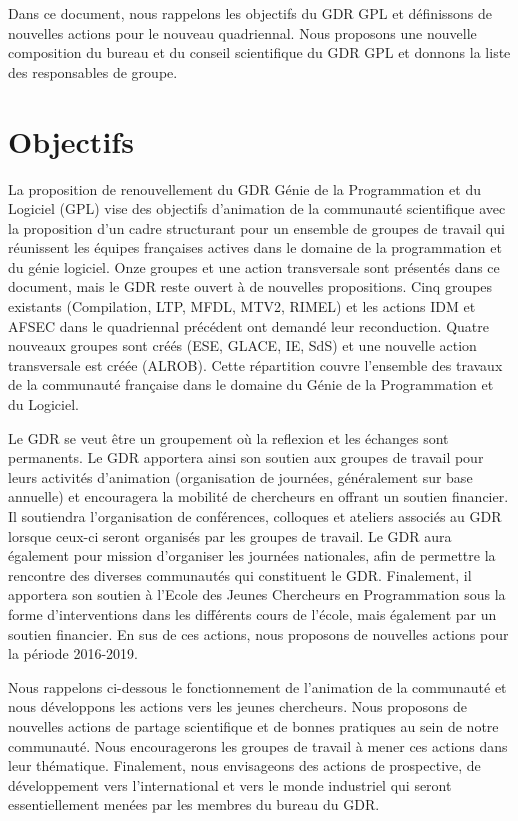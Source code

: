 \documentclass[11pt]{article}
\newcommand{\mynote}[3][black]{\textcolor{#1}{\fbox{\bfseries\sffamily\scriptsize{#2}}
{\small$\blacktriangleright$\textsf{\emph{#3}}$\blacktriangleleft$}}}
\newcommand{\pem}[1]{} %
\begin{document}
Dans ce document, nous rappelons les objectifs du GDR GPL et définissons de
nouvelles actions pour le nouveau quadriennal. Nous proposons une nouvelle
composition du bureau et du conseil scientifique du GDR GPL et donnons la liste
des responsables de groupe. 

\section{Objectifs}

La proposition de renouvellement du GDR Génie de la Programmation et du
Logiciel (GPL) vise des objectifs d'animation de la communauté scientifique
avec la proposition d'un cadre structurant pour un ensemble de groupes de
travail qui réunissent les équipes françaises actives dans le domaine de la
programmation et du génie logiciel. Onze groupes et une action transversale sont présentés
dans ce document, mais le GDR reste ouvert à de nouvelles propositions. Cinq
groupes existants (Compilation, LTP, MFDL, MTV2, RIMEL) et les actions IDM et
AFSEC dans le quadriennal précédent ont demandé leur reconduction. Quatre
nouveaux groupes sont créés (ESE, GLACE, IE, SdS) et une nouvelle action
transversale est créée (ALROB). Cette répartition couvre l'ensemble des travaux
de la communauté française dans le domaine du Génie de la Programmation et du Logiciel.

Le GDR se veut être un groupement\pem{est-ce le bon terme ?} où la reflexion et les échanges sont permanents.
Le GDR apportera ainsi son soutien aux groupes de travail pour leurs activités d'animation (organisation de journées, généralement sur base annuelle) et encouragera la mobilité de chercheurs en offrant un soutien financier. Il soutiendra l'organisation de conférences, colloques et ateliers associés au GDR lorsque ceux-ci seront organisés par les groupes de travail.
Le GDR aura également pour mission d'organiser les journées nationales, afin de permettre la rencontre des diverses communautés qui constituent le GDR. Finalement, il apportera son soutien à l'Ecole des Jeunes Chercheurs en Programmation sous la forme d'interventions dans les différents cours de l'école, mais également par un soutien financier. En sus de ces actions, nous proposons de nouvelles actions pour la période 2016-2019. 

Nous rappelons ci-dessous le fonctionnement de l'animation de la communauté et nous développons les actions vers les jeunes chercheurs. Nous proposons de nouvelles actions de partage scientifique et de bonnes pratiques au sein de notre communauté. Nous encouragerons les groupes de travail à mener ces actions dans leur thématique.
Finalement, nous envisageons des actions de prospective, de développement vers l'international et vers le monde industriel qui seront essentiellement menées par les membres du bureau du GDR.
\end{document}

